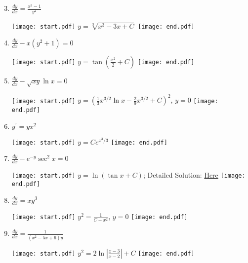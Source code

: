 \documentclass[12pt]{article}
\begin{document}
\begin{enumerate}
\setcounter{enumi}{2}

\item $\frac{dy}{dx}=\frac{x^2-1}{y^2}$

\texttt{[image: start.pdf]}
{{$y=\sqrt[3]{x^3-3x+C}$}}
\texttt{[image: end.pdf]}


\item $\frac{dy}{dx}-x(y^2+1)=0$

\texttt{[image: start.pdf]}
{{$y=\tan{\left(\frac{x^2}{2}+C\right)}$}}
\texttt{[image: end.pdf]}


\item $\frac{dy}{dx}-\sqrt{xy}\ln{x}=0$

\texttt{[image: start.pdf]}
{{$y=\left(\frac{1}{3}x^{3/2}\ln{x}-\frac{2}{9}x^{3/2}+C\right)^2$, $y=0$}}
\texttt{[image: end.pdf]}


\item $y^{\prime}=yx^2$

\texttt{[image: start.pdf]}
{{$y=Ce^{x^3/3}$}}
\texttt{[image: end.pdf]}


\item $\frac{dy}{dx}-e^{-y}\sec^2{x}=0$

\texttt{[image: start.pdf]}
{{$y=\ln{(\tan{x}+C)}$; Detailed Solution: \textcolor{blue}{\href{http://www.math.drexel.edu/classes/Calculus/resources/Math122HW/Solutions/122_14_ODE_07.pdf}{Here}}}}
\texttt{[image: end.pdf]}


\end{enumerate}


\begin{enumerate}
\setcounter{enumi}{7}

\item $\frac{dy}{dx}=xy^3$

\texttt{[image: start.pdf]}
{{$y^2=\frac{1}{C-x^2}$, $y=0$}}
\texttt{[image: end.pdf]}


\item $\frac{dy}{dx}=\frac{1}{(x^2-5x+6)y}$

\texttt{[image: start.pdf]}
{{$y^2=2\ln{\left|\frac{x-3}{x-2}\right|}+C$}}
\texttt{[image: end.pdf]}


\end{enumerate}
\end{document}

